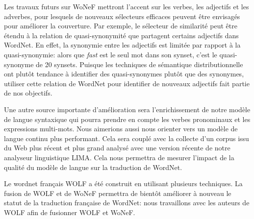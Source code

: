 Les travaux futurs sur WoNeF mettront l'accent sur les verbes, les adjectifs et les adverbes, pour lesquels de nouveaux sélecteurs efficaces peuvent être envisagés pour améliorer la couverture. Par exemple, le sélecteur de similarité peut être étendu à la relation de quasi-synonymité que partagent certains adjectifs dans WordNet. En effet, la synonymie entre les adjectifs est limitée par rapport à la quasi-synonymie: alors que \textit{fast} est le seul mot dans son synset, c'est le quasi-synonyme de 20 synsets. Puisque les techniques de sémantique distributionnelle ont plutôt tendance à identifier des quasi-synonymes plutôt que des synonymes, utiliser cette relation de WordNet pour identifier de nouveaux adjectifs fait partie de nos objectifs.

Une autre source importante d'amélioration sera l'enrichissement de notre modèle de langue syntaxique qui pourra prendre en compte les verbes pronominaux et les expressions multi-mots. Nous aimerions aussi nous orienter vers un modèle de langue continu \citep{haison2012continuous} plus performant. Cela sera couplé avec la collecte d'un corpus issu du Web plus récent et plus grand analysé avec une version récente de notre analyseur linguistique LIMA. Cela nous permettra de mesurer l'impact de la qualité du modèle de langue sur la traduction de WordNet.

Le wordnet français WOLF a été construit en utilisant plusieurs techniques. La fusion de WOLF et de WoNeF permettra de bientôt améliorer à nouveau le statut de la traduction française de WordNet: nous travaillons avec les auteurs de WOLF afin de fusionner WOLF et WoNeF.


